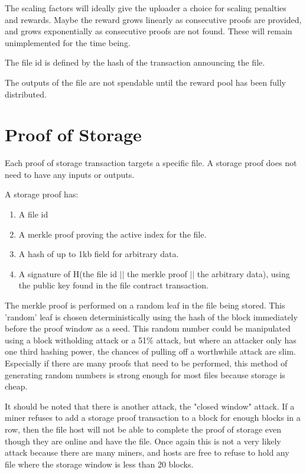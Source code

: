 \documentclass[twocolumn]{article}
\begin{document}
The scaling factors will ideally give the uploader a choice for scaling penalties and rewards. Maybe the reward grows linearly as consecutive proofs are provided, and grows exponentially as consecutive proofs are not found. These will remain unimplemented for the time being.

The file id is defined by the hash of the transaction announcing the file.

The outputs of the file are not spendable until the reward pool has been fully distributed.

\section{Proof of Storage}
Each proof of storage transaction targets a specific file.
A storage proof does not need to have any inputs or outputs.

A storage proof has:
\begin{enumerate}
	\item A file id
	\item A merkle proof proving the active index for the file.
	\item A hash of up to 1kb field for arbitrary data.
	\item A signature of H(the file id $||$ the merkle proof $||$ the arbitrary data), using the public key found in the file contract transaction.
\end{enumerate}

The merkle proof is performed on a random leaf in the file being stored.
This 'random' leaf is chosen deterministically using the hash of the block immediately before the proof window as a seed.
This random number could be manipulated using a block witholding attack or a 51\% attack, but where an attacker only has one third hashing power, the chances of pulling off a worthwhile attack are slim.
Especially if there are many proofs that need to be performed, this method of generating random numbers is strong enough for most files because storage is cheap.

It should be noted that there is another attack, the "closed window" attack.
If a miner refuses to add a storage proof transaction to a block for enough blocks in a row, then the file host will not be able to complete the proof of storage even though they are online and have the file.
Once again this is not a very likely attack because there are many miners, and hosts are free to refuse to hold any file where the storage window is less than 20 blocks.
\end{document}
